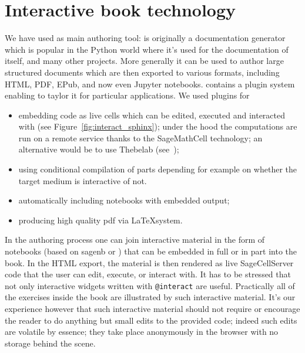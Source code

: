 \documentclass{deliverablereport}
\begin{document}
\section{Interactive book technology}

We have used \Sphinx as main authoring tool: \Sphinx is originally a
documentation generator which is popular in the Python world where
it's used for the documentation of \Python itself, and many other
projects. More generally it can be used to author large structured
documents which are then exported to various formats, including HTML,
PDF, EPub, and now even Jupyter notebooks. \Sphinx contains a plugin
system enabling to taylor it for particular applications. We used
plugins for
\begin{itemize}
\item embedding \Sage code as live cells which can be edited, executed
  and interacted with (see Figure~\ref{fig:interact_sphinx}); under
  the hood the computations are run on a remote service thanks to the
  SageMathCell technology; an alternative would be to use Thebelab
  (see~);
\item using conditional compilation of parts depending for example on
  whether the target medium is interactive of not.
\item automatically including \Jupyter notebooks with embedded output;
\item producing high quality pdf via \LaTeX system.
\end{itemize}

In the authoring process one can join interactive material in the form
of notebooks (based on sagenb or \Jupyter) that can be embedded in
full or in part into the \Sphinx book. In the HTML export, the
material is then rendered as live SageCellServer code that the user
can edit, execute, or interact with. It has to be stressed that not
only interactive widgets written with \texttt{@interact} are useful.
Practically all of the  exercises inside the book are
illustrated by such interactive material. It's our experience however
that such interactive material should not require or encourage the
reader to do anything but small edits to the provided code; indeed
such edits are volatile by essence; they take place anonymously in the
browser with no storage behind the scene.
\end{document}

